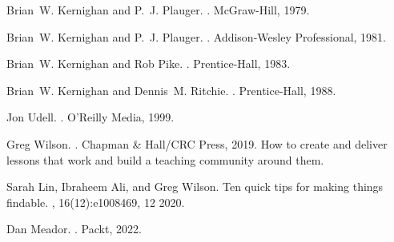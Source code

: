 \documentclass[10pt,letterpaper]{article}
\begin{document}
\begin{thebibliography}{1}

Brian~W. Kernighan and P.~J. Plauger.
.
\newblock McGraw-Hill, 1979.

Brian~W. Kernighan and P.~J. Plauger.
.
\newblock Addison-Wesley Professional, 1981.

Brian~W. Kernighan and Rob Pike.
.
\newblock Prentice-Hall, 1983.

Brian~W. Kernighan and Dennis~M. Ritchie.
.
\newblock Prentice-Hall, 1988.

Jon Udell.
.
\newblock O'Reilly Media, 1999.

Greg Wilson.
.
\newblock Chapman \& Hall/CRC Press, 2019.
\newblock How to create and deliver lessons that work and build a teaching
  community around them.

Sarah Lin, Ibraheem Ali, and Greg Wilson.
\newblock Ten quick tips for making things findable.
, 16(12):e1008469, 12 2020.

Dan Meador.
.
\newblock Packt, 2022.

\end{thebibliography}
\end{document}

